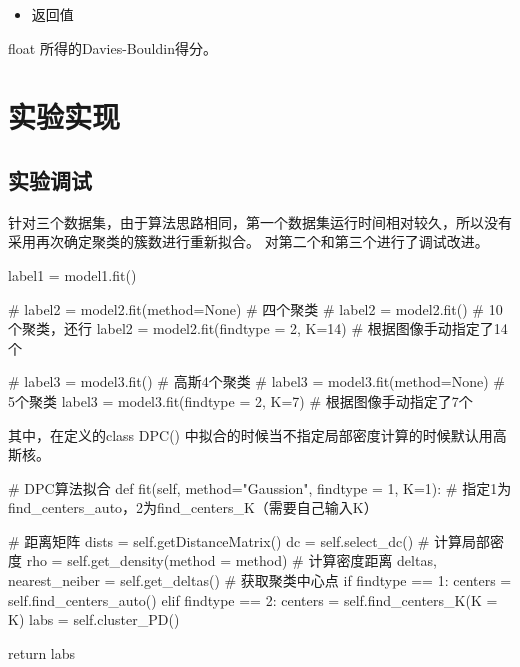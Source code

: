 \documentclass[UTF8,a4paper,AutoFakeBold,AutoFakeSlant]{article}
\begin{document}
\begin{itemize}
  \item 返回值
\end{itemize}

float
所得的Davies-Bouldin得分。








\section{实验实现}


\subsection{实验调试}

针对三个数据集，由于算法思路相同，第一个数据集运行时间相对较久，所以没有采用再次确定聚类的簇数进行重新拟合。
对第二个和第三个进行了调试改进。

\begin{python}
  label1 = model1.fit()

  # label2 = model2.fit(method=None) # 四个聚类
  # label2 = model2.fit() # 10个聚类，还行
  label2 = model2.fit(findtype = 2, K=14) # 根据图像手动指定了14个

  # label3 = model3.fit() # 高斯4个聚类
  # label3 = model3.fit(method=None) # 5个聚类
  label3 = model3.fit(findtype = 2, K=7) # 根据图像手动指定了7个
\end{python}

其中，在定义的class DPC() 中拟合的时候当不指定局部密度计算的时候默认用高斯核。
\begin{python}
  # DPC算法拟合
  def fit(self, method="Gaussion", findtype = 1, K=1): # 指定1为find_centers_auto，2为find_centers_K（需要自己输入K）
      
      # 距离矩阵
      dists = self.getDistanceMatrix()
      dc = self.select_dc()
      # 计算局部密度
      rho = self.get_density(method = method)
      # 计算密度距离
      deltas, nearest_neiber = self.get_deltas()
      # 获取聚类中心点
      if findtype == 1:
          centers = self.find_centers_auto()
      elif findtype == 2:
          centers = self.find_centers_K(K = K)
      labs = self.cluster_PD()
      
      return labs
\end{python}
\end{document}
